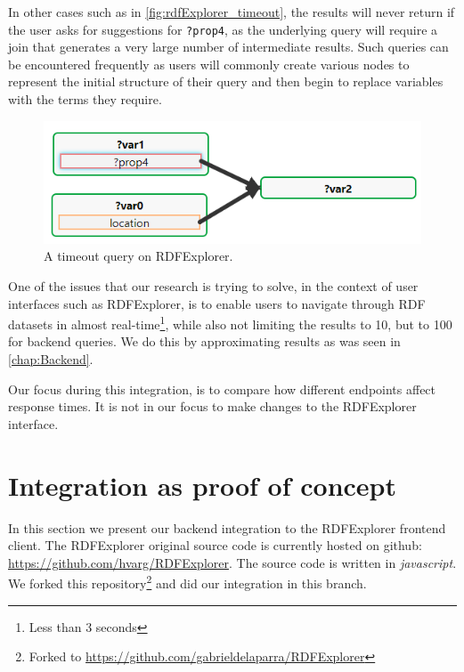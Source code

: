 In other cases such as in \autoref{fig:rdfExplorer_timeout}, the results will never return if the user asks for suggestions for \texttt{?prop4}, as the underlying query will require a join that generates a very large number of intermediate results. Such queries can be encountered frequently as users will commonly create various nodes to represent the initial structure of their query and then begin to replace variables with the terms they require. 

\begin{figure}[h]
    \centering
        \includegraphics[width=0.7\linewidth]{imagenes/timeout query.png}
        \caption{A timeout query on RDFExplorer.}
        \label{fig:rdfExplorer_timeout}
\end{figure}

One of the issues that our research is trying to solve, in the context of user interfaces such as RDFExplorer, is to enable users to navigate through RDF datasets in almost real-time\footnote{Less than 3 seconds}, while also not limiting the results to 10, but to 100 for backend queries. We do this by approximating results as was seen in \autoref{chap:Backend}.

Our focus during this integration, is to compare how different endpoints affect response times. It is not in our focus to make changes to the RDFExplorer interface.


\section{Integration as proof of concept}

In this section we present our backend integration to the RDFExplorer frontend client. The RDFExplorer original source code is currently hosted on github: \url{https://github.com/hvarg/RDFExplorer}. The source code is written in \textit{javascript}. We forked this repository\footnote{Forked to \url{https://github.com/gabrieldelaparra/RDFExplorer}} and did our integration in this branch. 

